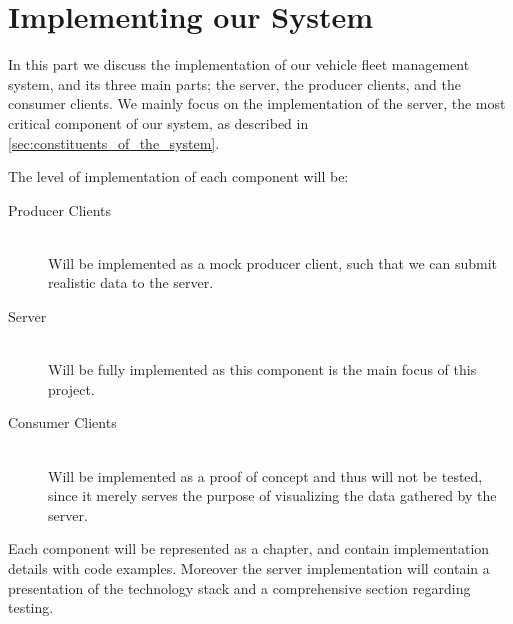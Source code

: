 \chapter{Implementing our System}
In this part we discuss the implementation of our vehicle fleet management system, and its three main parts; the server, the producer clients, and the consumer clients.
We mainly focus on the implementation of the server, the most critical component of our system, as described in \cref{sec:constituents_of_the_system}.

The level of implementation of each component will be:

\begin{description}
    \item[Producer Clients]\hfill\\
        Will be implemented as a mock producer client, such that we can submit realistic data to the server.
    \item[Server]\hfill\\
        Will be fully implemented as this component is the main focus of this project.
    \item[Consumer Clients]\hfill\\
        Will be implemented as a proof of concept and thus will not be tested, since it merely serves the purpose of visualizing the data gathered by the server.
\end{description}

\bigskip
Each component will be represented as a chapter, and contain implementation details with code examples.
Moreover the server implementation will contain a presentation of the technology stack and a comprehensive section regarding testing.
